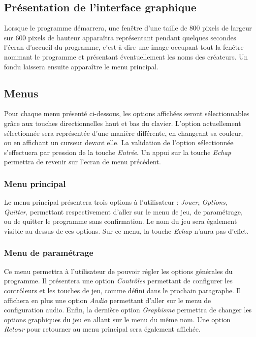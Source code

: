 \subsection{Présentation de l'interface graphique}

Lorsque le programme démarrera, une fenêtre d'une taille de 800 pixels de largeur sur 600 pixels de hauteur apparaîtra représentant pendant quelques secondes l'écran d'accueil du programme, c'est-à-dire une image occupant tout la fenêtre nommant le programme et présentant éventuellement les noms des créateurs. Un fondu laissera ensuite apparaître le menu principal.

\subsection{Menus}

Pour chaque menu présenté ci-dessous, les options affichées seront sélectionnables grâce aux touches directionnelles haut et bas du clavier. L'option  actuellement sélectionnée sera représentée d'une manière différente, en changeant sa couleur, ou en affichant un curseur devant elle. La validation de l'option sélectionnée s'effectuera par pression de la touche \emph{Entrée}. Un appui sur la touche \emph{Echap} permettra de revenir sur l'ecran de menu précédent.

\subsubsection{Menu principal}

Le menu principal présentera trois options à l'utilisateur : \emph{Jouer}, \emph{Options}, \emph{Quitter}, permettant respectivement d'aller sur le menu de jeu, de paramétrage, ou de quitter le programme sans confirmation. Le nom du jeu sera également visible au-dessus de ces options. Sur ce menu, la touche \emph{Echap} n'aura pas d'effet.

\subsubsection{Menu de paramétrage}

Ce menu permettra à l'utilisateur de pouvoir régler les options générales du programme. Il présentera une option \emph{Contrôles} permettant de configurer les contrôleurs et les touches de jeu, comme défini dans le prochain paragraphe. Il affichera en plus une option \emph{Audio} permettant d'aller sur le menu de configuration audio. Enfin, la dernière option \emph{Graphisme} permettra de changer les options graphiques du jeu en allant sur le menu du même nom. Une option \emph{Retour} pour retourner au menu principal sera également affichée.

